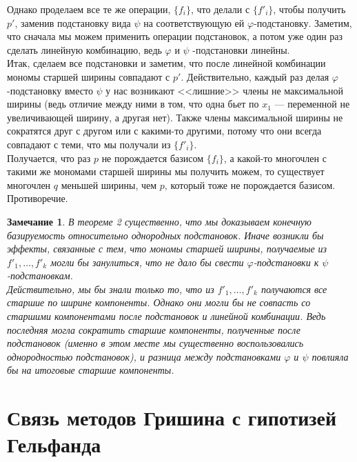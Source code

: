 \documentclass[12pt,a4paper]{article}
\newtheorem{remark}{Замечание}[section]
\begin{document}
    Однако проделаем все те же операции, $\{f_i\}$, что делали с $\{f'_i\}$, чтобы получить $p'$, заменив подстановку вида $\psi$ на соответствующую ей $\varphi$-подстановку. Заметим, что сначала мы можем применить операции подстановок, а потом уже один раз сделать линейную комбинацию, ведь $\varphi$ и $\psi$ -подстановки линейны.\\
    Итак, сделаем все подстановки и заметим, что после линейной комбинации мономы старшей ширины совпадают с $p'$. Действительно, каждый раз делая  $\varphi$-подстановку вместо $\psi$ у нас возникают <<лишние>> члены не максимальной ширины (ведь отличие между ними в том, что одна бьет по $x_1$ --- переменной не увеличивающей ширину, а другая нет). Также члены максимальной ширины не сократятся друг с другом или с какими-то другими, потому что они всегда совпадают с теми, что мы получали из $\{f'_i\}$.\\
    Получается, что раз $p$ не порождается базисом $\{f_i\}$, а какой-то многочлен с такими же мономами старшей ширины мы получить можем, то существует многочлен $q$ меньшей ширины, чем $p$, который тоже не порождается базисом.
    Противоречие.
    \vskip 0.1in\noindent
    \begin{remark}
        В теореме 2 существенно, что мы доказываем конечную базируемость относительно однородных подстановок. Иначе возникли бы эффекты, связанные с тем, что мономы старшей ширины, получаемые из $f'_1,\ldots,f'_k$ могли бы занулиться, что не дало бы свести $\varphi$-подстановки к $\psi$-подстановкам. \\Действительно, мы бы знали только то, что из $f'_1,\ldots,f'_k$ получаются все старшие по ширине компоненты. Однако они могли бы не совпасть со старшими компонентами после подстановок и линейной комбинации. Ведь последняя могла сократить старшие компоненты, полученные после подстановок (именно в этом месте мы существенно воспользовались однородностью подстановок), и разница между подстановками $\varphi$ и $\psi$ повлияла бы на итоговые старшие компоненты.
    \end{remark}


    \section{Связь методов Гришина с гипотизей Гельфанда}




    \printbibliography
\end{document}
